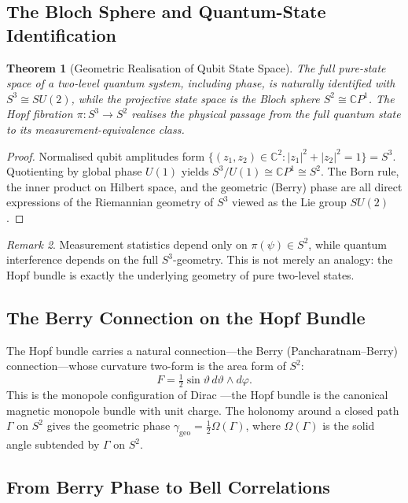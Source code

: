 \documentclass[12pt,a4paper]{article}
\newtheorem{theorem}{Theorem}[section]
\theoremstyle{definition}
\theoremstyle{remark}
\newtheorem{remark}[theorem]{Remark}
\begin{document}
\subsection{The Bloch Sphere and Quantum-State Identification}

\begin{theorem}[Geometric Realisation of Qubit State Space]
The full pure-state space of a two-level quantum system, including phase, is
naturally identified with $S^3 \cong SU(2)$, while the projective state space is
the Bloch sphere $S^2 \cong \mathbb{C}P^1$. The Hopf fibration
$\pi: S^3 \to S^2$ realises the physical passage from the full quantum state to its
measurement-equivalence class.
\end{theorem}

\begin{proof}
Normalised qubit amplitudes form $\{(z_1,z_2)\in\mathbb{C}^2: |z_1|^2+|z_2|^2=1\}=S^3$.
Quotienting by global phase $U(1)$ yields $S^3/U(1) \cong \mathbb{C}P^1 \cong S^2$.
The Born rule, the inner product on Hilbert space, and the geometric (Berry) phase
are all direct expressions of the Riemannian geometry of $S^3$ viewed as the
Lie group $SU(2)$.
\end{proof}

\begin{remark}
Measurement statistics depend only on $\pi(\psi)\in S^2$, while quantum interference
depends on the full $S^3$-geometry. This is not merely an analogy: the Hopf bundle
is exactly the underlying geometry of pure two-level states.
\end{remark}

\subsection{The Berry Connection on the Hopf Bundle}

The Hopf bundle carries a natural connection---the Berry (Pancharatnam--Berry)
connection---whose curvature two-form is the area form of $S^2$:
\[
F = \tfrac{1}{2}\sin\vartheta\, d\vartheta \wedge d\varphi.
\]
This is the monopole configuration of Dirac \cite{Dirac1931}---the Hopf bundle is
the canonical magnetic monopole bundle with unit charge. The holonomy around a
closed path $\Gamma$ on $S^2$ gives the geometric phase
$\gamma_{\mathrm{geo}} = \tfrac{1}{2}\Omega(\Gamma)$, where $\Omega(\Gamma)$ is
the solid angle subtended by $\Gamma$ on $S^2$.

\subsection{From Berry Phase to Bell Correlations}
\end{document}

